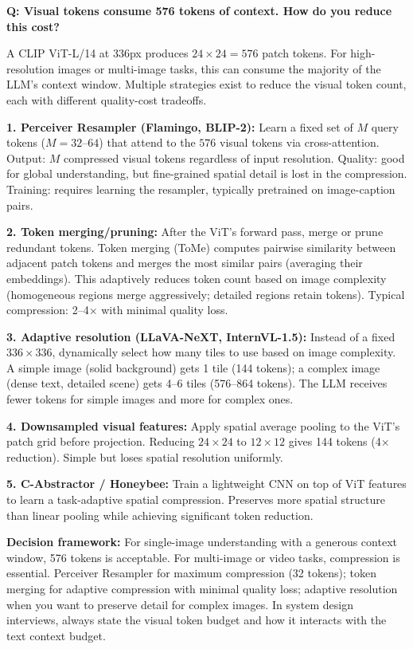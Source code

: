 \begin{interviewq}
\textbf{Q: Visual tokens consume 576 tokens of context. How do you reduce this cost?}

 \quad {} \quad \badgefreq{\freqmed}

\stronganswer

A CLIP ViT-L/14 at 336px produces $24 \times 24 = 576$ patch tokens. For high-resolution images or multi-image tasks, this can consume the majority of the LLM's context window. Multiple strategies exist to reduce the visual token count, each with different quality-cost tradeoffs.

\textbf{1. Perceiver Resampler (Flamingo, BLIP-2):} Learn a fixed set of $M$ query tokens ($M = 32$--$64$) that attend to the $576$ visual tokens via cross-attention. Output: $M$ compressed visual tokens regardless of input resolution. Quality: good for global understanding, but fine-grained spatial detail is lost in the compression. Training: requires learning the resampler, typically pretrained on image-caption pairs.

\textbf{2. Token merging/pruning:} After the ViT's forward pass, merge or prune redundant tokens. Token merging (ToMe) computes pairwise similarity between adjacent patch tokens and merges the most similar pairs (averaging their embeddings). This adaptively reduces token count based on image complexity (homogeneous regions merge aggressively; detailed regions retain tokens). Typical compression: 2--4$\times$ with minimal quality loss.

\textbf{3. Adaptive resolution (LLaVA-NeXT, InternVL-1.5):} Instead of a fixed $336 \times 336$, dynamically select how many tiles to use based on image complexity. A simple image (solid background) gets 1 tile (144 tokens); a complex image (dense text, detailed scene) gets 4--6 tiles (576--864 tokens). The LLM receives fewer tokens for simple images and more for complex ones.

\textbf{4. Downsampled visual features:} Apply spatial average pooling to the ViT's patch grid before projection. Reducing $24 \times 24$ to $12 \times 12$ gives 144 tokens (4$\times$ reduction). Simple but loses spatial resolution uniformly.

\textbf{5. C-Abstractor / Honeybee:} Train a lightweight CNN on top of ViT features to learn a task-adaptive spatial compression. Preserves more spatial structure than linear pooling while achieving significant token reduction.

\textbf{Decision framework:} For single-image understanding with a generous context window, 576 tokens is acceptable. For multi-image or video tasks, compression is essential. Perceiver Resampler for maximum compression (32 tokens); token merging for adaptive compression with minimal quality loss; adaptive resolution when you want to preserve detail for complex images. In system design interviews, always state the visual token budget and how it interacts with the text context budget.


\end{interviewq}
